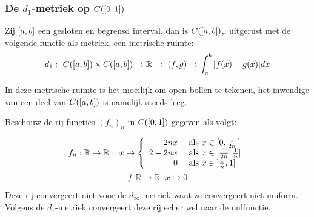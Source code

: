 \documentclass[main.tex]{subfiles}
\begin{document}
\subsubsection{De $d_1$-metriek op $C(\interval{0}{1})$}
\label{sec:de-d_1-metriek}

\begin{vb}
  Zij $\interval{a}{b}$ een gesloten en begrensd interval, dan is $C(\interval{a}{b})$,, uitgerust met de volgende functie als metriek, een metrische ruimte:
  \[ d_{1}:\ C(\interval{a}{b})\times C(\interval{a}{b}) \rightarrow \mathbb{R}^{+}:\ (f,g) \mapsto \int_{a}^{b}|f(x)-g(x)|dx \]
\end{vb}

\begin{opm}
  In deze metrische ruimte is het moeilijk om open bollen te tekenen, het inwendige van een deel van $C(\interval{a}{b})$ is namelijk steeds leeg.
\end{opm}


\begin{vb}
  Beschouw de rij functies $(f_{n})_{n}$ in $C(\interval{0}{1})$ gegeven als volgt:

  \noindent
  \begin{minipage}{.45\textwidth}
    \begin{figure}[H]
      \centering
    \end{figure}
  \end{minipage}
  \begin{minipage}{.45\textwidth}
  \[
  f_{n}: \mathbb{R} \rightarrow \mathbb{R}:\ x \mapsto
  \left\{
    \begin{array}{rl}
      2nx   & \text{ als } x \in \interval[open right]{0}{\frac{1}{2n}}\\
      2-2nx & \text{ als } x \in \interval{\frac{1}{2n}}{\frac{1}{n}}\\
      0     & \text{ als } x \in \interval[open left ]{\frac{1}{n}}{1}\\
    \end{array}
  \right.
  \]
  \[ f: \mathbb{R} \rightarrow \mathbb{R}:\ x \mapsto 0 \]
  \end{minipage}
  
  Deze rij convergeert niet voor de $d_{\infty}$-metriek want ze convergeert niet uniform.
  Volgens de $d_{1}$-metriek convergeert deze rij echer wel naar de nulfunctie.
\end{vb}
\end{document}
